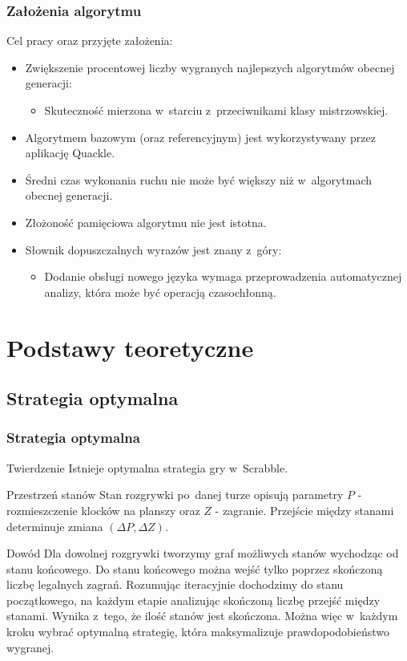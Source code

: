 \documentclass[10pt,a4paper]{beamer}
\begin{document}
\begin{frame}
	\frametitle{Założenia algorytmu}
	
	Cel pracy oraz przyjęte założenia:

	\begin{itemize}
		\item Zwiększenie procentowej liczby wygranych najlepszych algorytmów obecnej generacji:
			\begin{itemize}
				\item Skuteczność mierzona w~starciu z~przeciwnikami klasy mistrzowskiej.
			\end{itemize}
		\item Algorytmem bazowym (oraz referencyjnym) jest wykorzystywany przez aplikację Quackle.
		\item Średni czas wykonania ruchu nie może być większy niż w~algorytmach obecnej generacji.
		\item Złożoność pamięciowa algorytmu nie jest istotna.
		\item Słownik dopuszczalnych wyrazów jest znany z~góry:
			\begin{itemize}
				\item Dodanie obsługi nowego języka wymaga przeprowadzenia automatycznej analizy, która może być operacją czasochłonną.
			\end{itemize}
	\end{itemize}
\end{frame}

\section{Podstawy teoretyczne}
\subsection{Strategia optymalna}

\begin{frame}
	\frametitle{Strategia optymalna}

	\begin{block}{Twierdzenie}	
		Istnieje optymalna strategia gry w~Scrabble.
	\end{block}

	\begin{block}{Przestrzeń stanów}	
		Stan rozgrywki po~danej turze opisują parametry $P$ - rozmieszczenie klocków na planszy oraz $Z$ - zagranie. Przejście między stanami determinuje zmiana $(\Delta P, \Delta Z)$.
	\end{block}

	\begin{block}{Dowód}	
		Dla dowolnej rozgrywki tworzymy graf możliwych stanów wychodząc 
		od stanu końcowego. Do stanu końcowego można wejść tylko poprzez skończoną liczbę legalnych zagrań. Rozumując iteracyjnie dochodzimy do stanu początkowego, na każdym etapie analizując skończoną liczbę przejść między stanami. Wynika z~tego, że ilość stanów jest skończona. Można więc w~każdym kroku wybrać optymalną strategię, która maksymalizuje prawdopodobieństwo wygranej.
	\end{block}
\end{frame}
\end{document}
